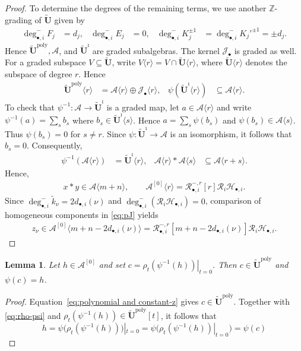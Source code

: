 \documentclass[a4paper,reqno,12pt]{amsart}
\numberwithin{equation}{section}
\newtheorem{lemma}[proposition]{Lemma}
\theoremstyle{definition}
\theoremstyle{plain}
\theoremstyle{definition}
\def\Z{\mathbb Z}
\def\tU{\widetilde{\mathbf U}}
\def\tUi{\widetilde{\mathbf U}^{\imath}}
\def\tk{\widetilde k}
\def\cA{\mathcal A}
\def\cR{\mathcal R}
\def\cH{\mathcal H}
\def\cJ{\mathcal J}
\newcommand{\poly}{\mathrm{poly}}
\begin{document}
\begin{proof}
To determine the degrees of the remaining terms, we use another $\Z$-grading of $\tU$ given by
\begin{align}
\deg_{\bullet,i}^- F_j&=d_j,
&\deg_{\bullet,i}^- E_j&=0,
&\deg_{\bullet,i}^- K_j^{\pm1}&=\deg_{\bullet,i}^- K_j'^{\pm1}=\pm d_j.
\label{eq:auxiliary}
\end{align}
Hence $\tU^\poly,\cA$, and $\tUi$ are graded subalgebras.
The kernel $\cJ_\bullet$ is graded as well.
For a graded subspace $V\subseteq\tU$, write
$V\langle r\rangle=V\cap\tU\langle r\rangle$, where
$\tU\langle r\rangle$ denotes the subspace of degree $r$. Hence
\begin{align}
\tU^\poly\langle r\rangle
&=\cA\langle r\rangle\oplus\cJ_\bullet\langle r\rangle,
&\psi(\tUi\langle r\rangle)&\subseteq\cA\langle r\rangle.
\label{eq:graded-projection}
\end{align}
To check that $\psi^{-1}:\cA\rightarrow\tUi$ is a graded map, let $a\in\cA\langle r\rangle$ and write
$\psi^{-1}(a)=\sum_s b_s$ where $b_s\in\tUi\langle s\rangle$. Hence $a=\sum_s\psi(b_s)$ and $\psi(b_s)\in\cA\langle s\rangle$. Thus $\psi(b_s)=0$ for $s\ne r$. Since $\psi:\tUi\rightarrow\cA$ is an isomorphism, it follows that $b_s=0$.
Consequently,
\begin{align}
\psi^{-1}(\cA\langle r\rangle)&=\tUi\langle r\rangle,
&\cA\langle r\rangle*\cA\langle s\rangle
&\subseteq\cA\langle r+s\rangle.
\label{eq:graded-star}
\end{align}
Hence,
\begin{align*}
x*y\in\cA\langle m+n\rangle,\qquad\cA^{[0]}\langle r\rangle=\cR_{\bullet,i}^{-,r}[r]\cR_i\cH_{\bullet,i}.
\end{align*}
Since $\deg_{\bullet,i}^-\tk_\nu=2d_{\bullet,i}(\nu)$ and $\deg_{\bullet,i}^-(\cR_i\cH_{\bullet,i})=0$, comparison of homogeneous components in \eqref{eq:pJ} yields
\begin{align*}
z_{\nu}
\in\cA^{[0]}\langle m+n-2d_{\bullet,i}(\nu)\rangle
=\cR_{\bullet,i}^{-,r}[m+n-2d_{\bullet,i}(\nu)]
\cR_i\cH_{\bullet,i}.
\end{align*}
\end{proof}

\begin{lemma}\label{lem:specialization}
Let $h\in\cA^{[0]}$ and set $c=\left.\rho_t(\psi^{-1}(h))\right|_{t=0}$. Then
$c\in\tU^\poly$ and $\psi(c)=h$.
\end{lemma}
\begin{proof}
 Equation~\eqref{eq:polynomial and constant-z} gives $c\in\tU^\poly$. Together with \eqref{eq:rho-psi} and $\rho_t(\psi^{-1}(h))\in\tU^\poly[t]$, it follows that 
 \begin{equation*}
  h=\psi\big(\rho_t(\psi^{-1}(h))\big)|_{t=0}=\psi\big(\rho_t(\psi^{-1}(h))|_{t=0}\big)=\psi(c)   
 \end{equation*}
\end{proof}
\end{document}
